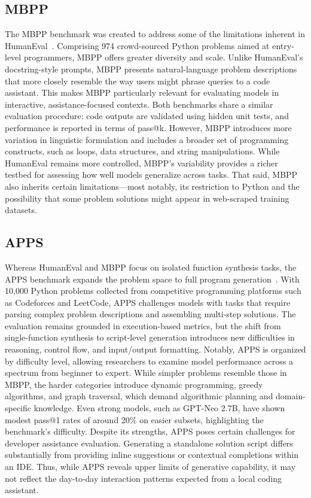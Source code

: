 \subsection{MBPP}
The \Gls{MBPP} benchmark was created to address some of the limitations inherent in HumanEval~\autocite{Austin2021}. Comprising 974 crowd-sourced Python problems aimed at entry-level programmers, \gls{MBPP} offers greater diversity and scale. Unlike HumanEval’s docstring-style prompts, \gls{MBPP} presents natural-language problem descriptions that more closely resemble the way users might phrase queries to a code assistant. This makes \gls{MBPP} particularly relevant for evaluating models in interactive, assistance-focused contexts. Both benchmarks share a similar evaluation procedure: code outputs are validated using hidden unit tests, and performance is reported in terms of pass@k. However, \gls{MBPP} introduces more variation in linguistic formulation and includes a broader set of programming constructs, such as loops, data structures, and string manipulations. While HumanEval remains more controlled, \gls{MBPP}’s variability provides a richer testbed for assessing how well models generalize across tasks. That said, \gls{MBPP} also inherits certain limitations—most notably, its restriction to Python and the possibility that some problem solutions might appear in web-scraped training datasets.

\subsection{APPS}
Whereas HumanEval and \gls{MBPP} focus on isolated function synthesis tasks, the \Gls{APPS} benchmark expands the problem space to full program generation~\autocite{Hendrycks2021}. With 10,000 Python problems collected from competitive programming platforms such as Codeforces and LeetCode, \gls{APPS} challenges models with tasks that require parsing complex problem descriptions and assembling multi-step solutions. The evaluation remains grounded in execution-based metrics, but the shift from single-function synthesis to script-level generation introduces new difficulties in reasoning, control flow, and input/output formatting. Notably, \gls{APPS} is organized by difficulty level, allowing researchers to examine model performance across a spectrum from beginner to expert. While simpler problems resemble those in \gls{MBPP}, the harder categories introduce dynamic programming, greedy algorithms, and graph traversal, which demand algorithmic planning and domain-specific knowledge. Even strong models, such as GPT-Neo 2.7B, have shown modest pass@1 rates of around 20\% on easier subsets, highlighting the benchmark’s difficulty. Despite its strengths, \gls{APPS} poses certain challenges for developer assistance evaluation. Generating a standalone solution script differs substantially from providing inline suggestions or contextual completions within an IDE. Thus, while \gls{APPS} reveals upper limits of generative capability, it may not reflect the day-to-day interaction patterns expected from a local coding assistant.

